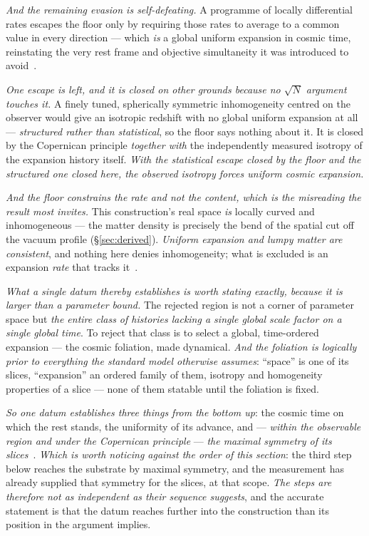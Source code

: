 \documentclass[11pt,a4paper]{article}
\theoremstyle{plain}
\theoremstyle{definition}
\begin{document}
\emph{And the remaining evasion is self-defeating.} A programme of locally differential rates escapes the
floor only by requiring those rates to average to a common value in every direction --- which \emph{is} a
global uniform expansion in cosmic time, reinstating the very rest frame and objective simultaneity it was
introduced to
avoid~\cite{JanzenModernParallax}.

\emph{One escape is left, and it is closed on other grounds because no $\sqrt N$ argument touches it.} A
finely tuned, spherically symmetric inhomogeneity centred on the observer would give an isotropic redshift
with no global uniform expansion at all --- \emph{structured rather than statistical}, so the floor says
nothing about it. It is closed by the Copernican principle \emph{together with} the independently measured
isotropy of the expansion history itself. \emph{With the statistical escape closed by the floor and the
structured one closed here, the observed isotropy forces uniform cosmic expansion.}

\emph{And the floor constrains the rate and not the content, which is the misreading the result most
invites.} This construction's real space \emph{is} locally curved and inhomogeneous --- the matter density is
precisely the bend of the spatial cut off the vacuum profile (\S\ref{sec:derived}). \emph{Uniform expansion
and lumpy matter are consistent}, and nothing here denies inhomogeneity; what is excluded is an expansion
\emph{rate} that tracks it~\cite{JanzenModernParallax}.

\emph{What a single datum thereby establishes is worth stating exactly, because it is larger than a
parameter bound.} The rejected region is not a corner of parameter space but \emph{the entire class of
histories lacking a single global scale factor on a single global time}. To reject that class is to select a
global, time-ordered expansion --- the cosmic foliation, made dynamical. \emph{And the foliation is
logically prior to everything the standard model otherwise assumes}: ``space'' is one of its slices,
``expansion'' an ordered family of them, isotropy and homogeneity properties of a slice --- none of them
statable until the foliation is fixed.

\emph{So one datum establishes three things from the bottom up}: the cosmic time on which the rest stands,
the uniformity of its advance, and --- \emph{within the observable region and under the Copernican
principle} --- \emph{the maximal symmetry of its slices}~\cite{JanzenModernParallax}. \emph{Which is worth
noticing against the order of this section}: the third step below reaches the substrate by maximal symmetry,
and the measurement has already supplied that symmetry for the slices, at that scope. \emph{The steps are
therefore not as independent as their sequence suggests}, and the accurate statement is that the datum reaches
further into the construction than its position in the argument implies.
\end{document}
